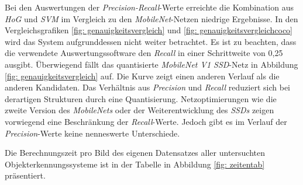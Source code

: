 



Bei den Auswertungen der \textit{Precision-Recall}-Werte erreichte die Kombination aus \textit{HoG} und \textit{SVM} im Vergleich zu den \textit{MobileNet}-Netzen niedrige Ergebnisse. In den Vergleichsgrafiken \ref{fig: genauigkeitsvergleich} und \ref{fig: genauigkeitsvergleichcoco} wird das System aufgrunddessen nicht weiter betrachtet. Es ist zu beachten, dass die verwendete Auswertungssoftware den \textit{Recall} in einer Schrittweite von 0,25 ausgibt. Überwiegend fällt das quantisierte \textit{MobileNet V1 SSD}-Netz in Abbildung \ref{fig: genauigkeitsvergleich} auf. Die Kurve zeigt einen anderen Verlauf als die anderen Kandidaten. Das Verhältnis aus \textit{Precision} und \textit{Recall} reduziert sich bei derartigen Strukturen durch eine Quantisierung. Netzoptimierungen wie die zweite Version des \textit{MobileNets} oder der Weiterentwicklung des \textit{SSDs} zeigen vorwiegend eine Beschränkung der \textit{Recall}-Werte. Jedoch gibt es im Verlauf der \textit{Precision}-Werte keine nenneswerte Unterschiede. 



Die Berechnungszeit pro Bild des eigenen Datensatzes aller untersuchten Objekterkennungssysteme ist in der Tabelle in Abbildung \ref{fig: zeitentab} präsentiert. 



